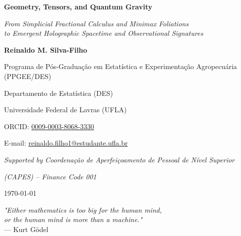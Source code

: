 \documentclass[11pt,a4paper,openright,twoside]{book}
\begin{document}
\frontmatter
\begin{titlepage}
    \centering
    \vspace*{2cm}
    
    {\Huge \textbf{Geometry, Tensors, and Quantum Gravity} \par}
    \vspace{1cm}
    {\large \textit{From Simplicial Fractional Calculus and Minimax Foliations} \\ \textit{to Emergent Holographic Spacetime and Observational Signatures} \par}
    
    \vspace{3cm}
    
    {\Large \textbf{Reinaldo M. Silva-Filho} \par}
    \vspace{0.5cm}
    {\normalsize Programa de P\'os-Gradua\c{c}\~ao em Estat\'istica e Experimenta\c{c}\~ao Agropecu\'aria (PPGEE/DES) \par}
    {\normalsize Departamento de Estat\'istica (DES) \par}
    {\normalsize Universidade Federal de Lavras (UFLA) \par}
    
    \vspace{0.8cm}
    {\normalsize ORCID: \href{https://orcid.org/0009-0003-8068-3330}{0009-0003-8068-3330} \par}
    {\normalsize E-mail: \href{mailto:reinaldo.filho1@estudante.ufla.br}{reinaldo.filho1@estudante.ufla.br} \par}
    
    \vspace{1.5cm}
    {\normalsize \textit{Supported by Coordena\c{c}\~ao de Aperfei\c{c}oamento de Pessoal de N\'ivel Superior} \par}
    {\normalsize \textit{(CAPES) -- Finance Code 001} \par}
    
    \vfill
    {\large \today \par}
\end{titlepage}

\vspace*{0.2\textheight}
\begin{flushright}
\textit{"Either mathematics is too big for the human mind, \\
or the human mind is more than a machine."} \\
\vspace{0.2cm}
--- Kurt G\"odel
\end{flushright}
\end{document}
